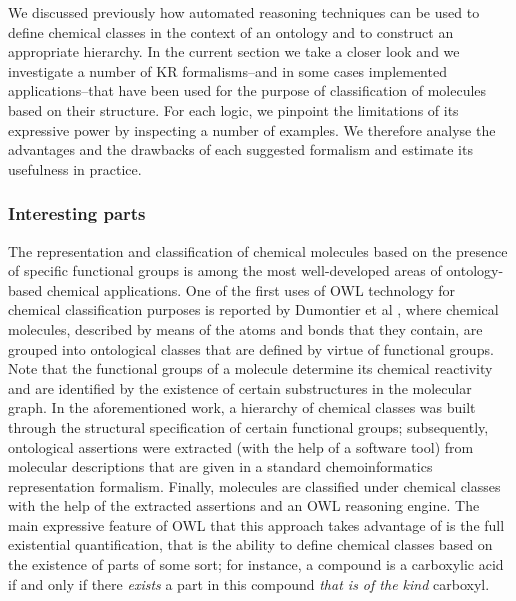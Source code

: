 \documentclass[10pt]{bmc_article}
\newenvironment{bmcformat}{\baselineskip20pt\sloppy\setboolean{publ}{false}}{\baselineskip20pt\sloppy}
\begin{document}
\begin{bmcformat}
We discussed previously how automated reasoning techniques can be used to define chemical classes in the context of an ontology and to construct an appropriate hierarchy. 
In the current section we take a closer look and we investigate a number of KR formalisms--and in some cases implemented applications--that have been used for the purpose of classification of molecules based on their structure.  For each logic, we pinpoint the limitations of its expressive power by inspecting a number of examples. 
We therefore analyse the advantages and the drawbacks of each suggested formalism and estimate its usefulness in practice.

% 
% 
%  



\subsubsection*{Interesting parts}


The representation and classification of chemical molecules based on the presence of specific functional groups is among the most well-developed areas of ontology-based chemical applications. One of the first uses of OWL technology for chemical classification purposes is reported by Dumontier et al \cite{dumontier2007}, where chemical molecules, described by means of the atoms and bonds that they contain, are grouped into ontological classes that are defined by virtue of functional groups. Note that the functional groups of a molecule determine its chemical reactivity and are identified by the existence of certain substructures in the molecular graph. In the aforementioned work, a hierarchy of chemical classes was built through the structural specification of certain functional groups; subsequently, ontological assertions were extracted (with the help of a software tool) from molecular descriptions that are given in a standard chemoinformatics representation formalism. Finally, molecules are classified under chemical classes with the help of the extracted assertions and an OWL reasoning engine. The main expressive feature of OWL that this approach takes advantage of is the full existential quantification, that is the ability to define chemical classes based on the existence of parts of some sort; for instance, a compound is a carboxylic acid if and only if there \emph{exists} a part in this compound \emph{that is of the kind} carboxyl.


\end{bmcformat}
\end{document}
